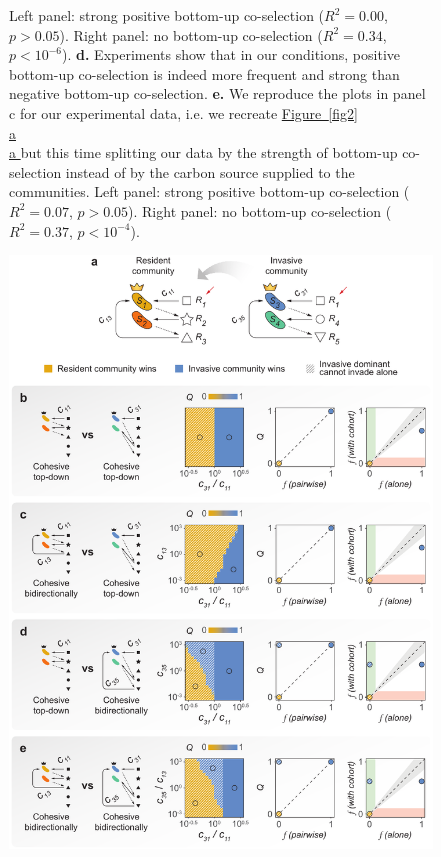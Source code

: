 \documentclass[a4paper,10pt]{article}
\newcommand{\figref}[2][]{%
  \hyperref[{#2}]{%
    Figure~\ref*{#2}%
    \ifx\\#1\\%
    \else
      #1%
    \fi
  }%
}
\begin{document}
\begin{figure}[!h]
{Left panel: strong positive bottom-up co-selection
($R^2=0.00$, $p>0.05$).
Right panel: no bottom-up co-selection
($R^2=0.34$, $p<10^{-6}$).
\textbf{d.} Experiments show that in our conditions, positive bottom-up co-selection is indeed more
frequent and strong than negative bottom-up co-selection.
\textbf{e.} We reproduce the plots in panel c for our experimental data,
i.e. we recreate
\figref[a]{fig2} but this time splitting our data by the strength of bottom-up co-selection
instead of by the carbon source supplied to the communities.
Left panel: strong positive bottom-up co-selection
($R^2=0.07$, $p>0.05$).
Right panel: no bottom-up co-selection
($R^2=0.37$, $p<10^{-4}$).}
\label{fig3}
\end{figure}

\clearpage

\begin{figure}[!h]
\centering
\internallinenumbers
\includegraphics[scale=0.7,keepaspectratio]{figs/fig4_v3.pdf}

\end{figure}
\end{document}
